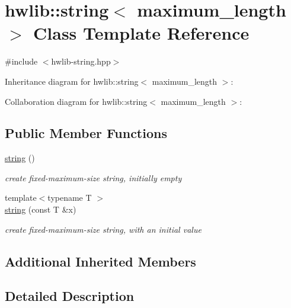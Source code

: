 \hypertarget{classhwlib_1_1string}{}\section{hwlib\+:\+:string$<$ maximum\+\_\+length $>$ Class Template Reference}
\label{classhwlib_1_1string}


{\ttfamily \#include $<$hwlib-\/string.\+hpp$>$}



Inheritance diagram for hwlib\+:\+:string$<$ maximum\+\_\+length $>$\+:


Collaboration diagram for hwlib\+:\+:string$<$ maximum\+\_\+length $>$\+:
\subsection*{Public Member Functions}
\begin{DoxyCompactItemize}
\item 
\mbox{\label{classhwlib_1_1string_ab1b5c2e4f2d5bc4519af16d625173123}} 
\hyperlink{classhwlib_1_1string_ab1b5c2e4f2d5bc4519af16d625173123}{string} ()
\begin{DoxyCompactList}\small\item\em create fixed-\/maximum-\/size string, initially empty \end{DoxyCompactList}\item 
\mbox{\label{classhwlib_1_1string_ac50acc0cd5b85bb7e95cc4f062fe2a3a}} 
{\footnotesize template$<$typename T $>$ }\\\hyperlink{classhwlib_1_1string_ac50acc0cd5b85bb7e95cc4f062fe2a3a}{string} (const T \&x)
\begin{DoxyCompactList}\small\item\em create fixed-\/maximum-\/size string, with an initial value \end{DoxyCompactList}\end{DoxyCompactItemize}
\subsection*{Additional Inherited Members}


\subsection{Detailed Description}
